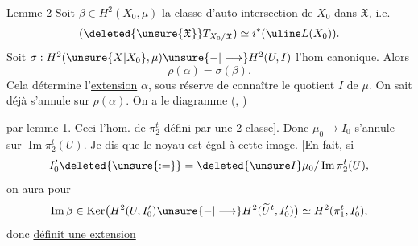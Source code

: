 \uline{Lemme 2} Soit $\beta\in H^2(X_0,\mu)$ la classe d'auto-intersection
de $X_0$ dans $\mathfrak X$, i.e.
\[
(\deleted{\unsure{\mathfrak X}}T_{X_0/\mathfrak X})
\simeq i^*(\uline L(X_0)).
\]
Soit $\sigma:H^2(\unsure{X|X_0},\mu)\unsure{-|\longrightarrow}H^2(U,I)$
l'hom canonique.
Alors
\[
\rho(\alpha)=\sigma(\beta).
\]
Cela détermine l'\uline{extension} $\alpha$, sous
réserve de connaître le quotient $I$ de $\mu$.
On sait déjà 
\deleted{\unsure{$\rho\beta$}}
s'annule sur $\rho(\alpha)$. On a le diagramme
(, )

par lemme 1. Ceci  l'hom.
 de $\pi_2^t$ défini par une 2-classe].
Donc 
$\mu_0\longrightarrow I_0$ \uline{s'annule sur}
$\operatorname{Im}\pi_2^t(U)$. Je dis que 
le noyau est \uline{égal} à cette image.
[En fait, si
\[
I'_0\deleted{\unsure{:=}}=\deleted{\unsure I}
\mu_0/\operatorname{Im}\pi_2^t(U),
\]
on aura pour
\[
\operatorname{Im}\beta\in
\operatorname{Ker}\bigl(H^2(U,I'_0)\unsure{-|\longrightarrow}
H^2(\widetilde U^t,I'_0)\bigr)
\simeq H^2(\pi_1^t,I'_0),
\]
donc 
\uline{définit une extension}
